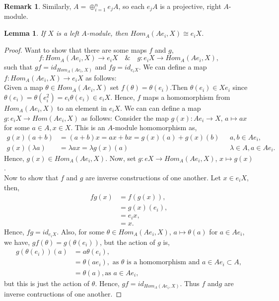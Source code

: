 \documentclass[11.5pt, twoside, a4paper, titlepage]{report}
\theoremstyle{definition}
\newtheorem{rem}[mydef]{Remark}
\theoremstyle{plain}
\newtheorem{lem}[mydef]{Lemma}
\begin{document}
\begin{rem}
Similarly, $A=\oplus_{i=1}^ne_jA$, so each $e_jA$ is a projective, right $A$-module.
\end{rem}

\begin{lem} \label{idempotenthomlem}
If $X$ is a left $A$-module, then $Hom_A(Ae_i,X)\cong e_iX$.
\end{lem}
\begin{proof}
Want to show that there are some maps $f$ and $g$,
\begin{equation*}
f: Hom_A(Ae_i, X) \to e_iX \quad \& \quad g: e_iX\to Hom_A(Ae_i, X),
\end{equation*}
such that $gf=id_{Hom_A(Ae_i, X)}$ and $fg=id_{e_iX}$.
We can define a map $f: Hom_A(Ae_i,X) \to e_iX$ as follows:\\
 Given a map $\theta \in Hom_A(Ae_i, X)$ set $f(\theta)=\theta(e_i)$.Then $\theta (e_i) \in Xe_i$ since $\theta(e_i)=\theta(e_i^2)=e_i\theta(e_i)\in e_iX$. Hence, $f$ maps a homomorphism from $Hom_A(Ae_i, X)$ to an element in $e_iX$.  We can can define a map $g:e_iX \to Hom(Ae_i, X)$ as follows: Consider the map $g(x): Ae_i \to X$, $a \mapsto ax$ for some $a\in A, x\in X$. This is an $A$-module homomorphism as, 
\begin{align*}
g(x)(a+b) &=(a+b)x=ax+bx=g(x)(a)+g(x)(b)\text{ } & a, b\in Ae_i,\\
g(x)(\lambda a) &=\lambda a x=\lambda g(x)(a) \text{ } & \lambda\in A, a \in Ae_i.
\end{align*}
Hence, $g(x) \in Hom_A(Ae_i, X)$. Now, set $g: eX \to Hom_A(Ae_i, X)$, $x \mapsto g(x)$. \\
Now to show that $f$ and $g$ are inverse constructions of one another. Let $x\in e_iX$, then,
\begin{align*}
fg(x)&=f(g(x)),\\
&=g(x)(e_i),\\
&=e_ix,\\
&=x.
\end{align*}
Hence, $fg=id_{e_iX}$. Also, for some $\theta \in Hom_A(Ae_i,X)$, $a \mapsto \theta(a)$ for $a\in Ae_i$, we have, $gf(\theta)=g(\theta(e_i))$, but the action of $g$ is,
\begin{align*}
g(\theta(e_i))(a)&=a\theta(e_i), \\
&=\theta(ae_i), \text{ as } \theta \text{ is a homomorphism and } a\in Ae_i\subset A,\\
&=\theta(a), \text{as } a\in Ae_i,
\end{align*}
but this is just the action of $\theta$. Hence, $gf=id_{Hom_A(Ae_i,X)}$. Thus $f$ and$g$ are inverse contructions of one another.
\end{proof}
\end{document}
